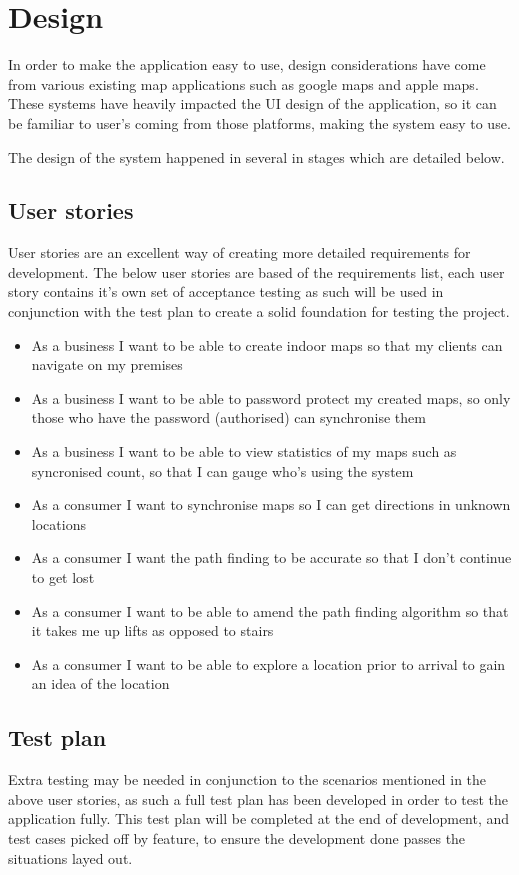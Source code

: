 \section{Design}
In order to make the application easy to use, design considerations have come from various existing map applications such as google maps and apple maps. These systems have heavily impacted the UI design of the application, so it can be familiar to user's coming from those platforms, making the system easy to use.

The design of the system happened in several in stages which are detailed below.

\subsection{User stories}
User stories are an excellent way of creating more detailed requirements for development. The below user stories are based of the requirements list, each user story contains it's own set of acceptance testing as such will be used in conjunction with the test plan to create a solid foundation for testing the project.

\begin{itemize}
	\item As a business I want to be able to create indoor maps so that my clients can navigate on my premises
	\item As a business I want to be able to password protect my created maps, so only those who have the password (authorised) can synchronise them
	\item As a business I want to be able to view statistics of my maps such as syncronised count, so that I can gauge who's using the system\\
	\item As a consumer I want to synchronise maps so I can get directions in unknown locations
	\item As a consumer I want the path finding to be accurate so that I don't continue to get lost
	\item As a consumer I want to be able to amend the path finding algorithm so that it takes me up lifts as opposed to stairs
	\item As a consumer I want to be able to explore a location prior to arrival to gain an idea of the location
\end{itemize}

\subsection{Test plan}
Extra testing may be needed in conjunction to the scenarios mentioned in the above user stories, as such a full test plan has been developed in order to test the application fully. This test plan will be completed at the end of development, and test cases picked off by feature, to ensure the development done passes the situations layed out.

